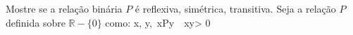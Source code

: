 \item Mostre se a relação binária
$P$ é reflexiva, simétrica, transitiva. Seja a relação $P$ definida sobre
$\mathbb{R}-\{0\}$ como:
\ben x, y\in {},\ xPy\ \Leftrightarrow\ xy> 0 \een


